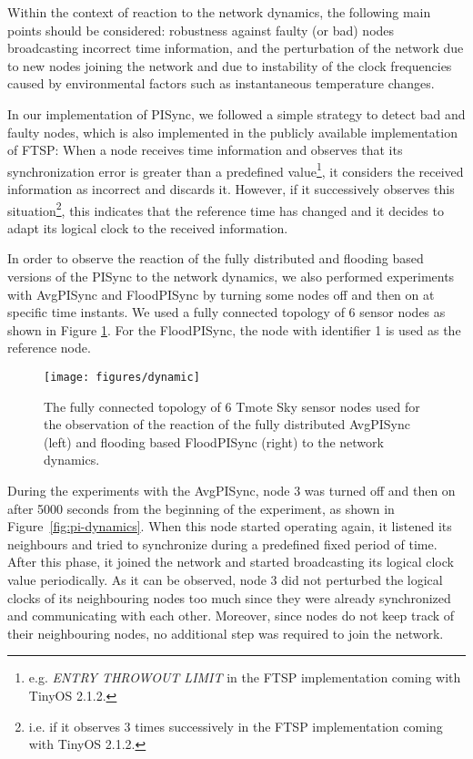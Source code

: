 \documentclass[english,a4paper,10pt,final]{article}
\numberwithin{equation}{section}
\numberwithin{figure}{section}
\begin{document}
 Within the context of reaction to the network dynamics, the following main points should be considered: robustness against faulty (or bad) nodes broadcasting incorrect time information, and the perturbation of the network due to new nodes joining the network and due to instability of the clock frequencies caused by environmental factors such as instantaneous temperature changes.  

In our implementation of PISync, we followed a simple strategy to detect bad and faulty nodes, which is also implemented in the publicly available implementation of FTSP: When a node receives time information and observes that its synchronization error is greater than a predefined value\footnote{e.g. \textit{ENTRY THROWOUT LIMIT} in the FTSP implementation coming with TinyOS 2.1.2.}, it considers the received information as incorrect and discards it. However, if it successively observes this situation\footnote{i.e. if it observes 3 times successively in the FTSP implementation coming with TinyOS 2.1.2.}, this indicates that the reference time has changed and it decides to adapt its logical clock  to the received information.

In order to observe the reaction of the fully distributed and flooding based versions of the PISync to the network dynamics, we also performed experiments with AvgPISync and FloodPISync by turning some nodes off and then on at specific time instants. We used a fully connected topology of 6 sensor nodes as shown in Figure \ref{fig:pi-dynamics1}. For the FloodPISync, the node with identifier 1 is used as the reference node.

\begin{figure}
\center

\texttt{[image: figures/dynamic]}

\caption{\label{fig:pi-dynamics1} The fully connected topology of 6 Tmote Sky sensor nodes used for the observation of the reaction of the fully distributed AvgPISync (left) and flooding based FloodPISync (right) to the network dynamics. }

\end{figure}

During the experiments with the AvgPISync, node 3 was turned off and then on after 5000 seconds from the beginning of the experiment, as shown in Figure~\ref{fig:pi-dynamics}. When this node started operating again, it listened its neighbours and tried to synchronize during a predefined fixed period of time. After this phase, it joined the network and started broadcasting its logical clock value periodically. As it can be observed, node 3 did not perturbed the logical clocks of its neighbouring nodes too much since they were already synchronized and communicating with each other. Moreover, since nodes do not keep track of their neighbouring nodes, no additional step was required to join the network. 
\end{document}
